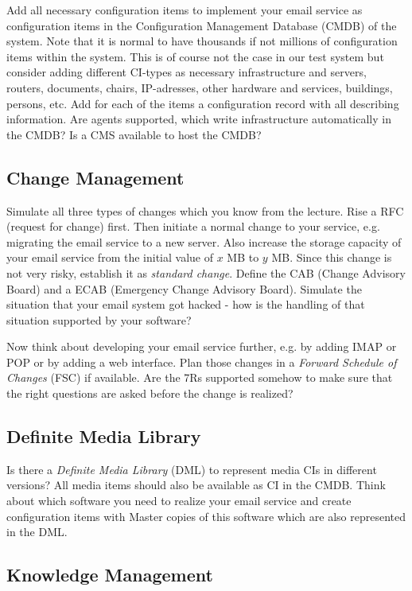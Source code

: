 Add all necessary configuration items to implement your email service as configuration items in the Configuration Management Database (CMDB) of the system. Note that it is normal to have thousands if not millions of configuration items within the system. This is of course not the case in our test system but consider adding different CI-types as necessary infrastructure and servers, routers, documents, chairs, IP-adresses, other hardware and services, buildings, persons, etc. Add for each of the items a configuration record with all describing information. Are agents supported, which write infrastructure automatically in the CMDB? Is a CMS available to host the CMDB?

\subsection{Change Management}
\label{sec:changeManagement}

Simulate all three types of changes which you know from the lecture. Rise a RFC (request for change) first. Then initiate a normal change to your service, e.g. migrating the email service to a new server. Also increase the storage capacity of your email service from the initial value of $x$ MB to $y$ MB. Since this change is not very risky, establish it as \emph{standard change}. Define the CAB (Change Advisory Board) and a ECAB (Emergency Change Advisory Board). Simulate the situation that your email system got hacked - how is the handling of that situation supported by your software?

Now think about developing your email service further, e.g. by adding IMAP or POP or by adding a web interface. Plan those changes in a \emph{Forward Schedule of Changes} (FSC) if available. Are the 7Rs supported somehow to make sure that the right questions are asked before the change is realized?

\subsection{Definite Media Library}
\label{sec:definiteMediaLibrary}

Is there a \emph{Definite Media Library} (DML) to represent media CIs in different versions? All media items should also be available as CI in the CMDB. Think about which software you need to realize your email service and create configuration items with Master copies of this software which are also represented in the DML.

\subsection{Knowledge Management}
\label{sec:knowledgeManagement}

